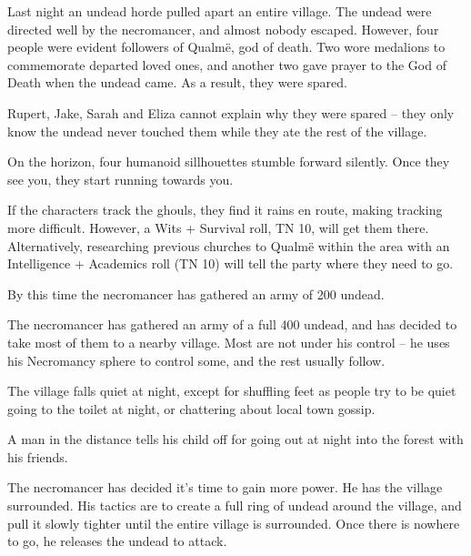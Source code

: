 \begin{multicols}{2}

Last night an undead horde pulled apart an entire village.  The undead were directed well by the necromancer, and almost nobody escaped.
However, four people were evident followers of Qualm\"{e}, god of death.
Two wore medalions to commemorate departed loved ones, and another two gave prayer to the God of Death when the undead came.
As a result, they were spared.

Rupert, Jake, Sarah and Eliza cannot explain why they were spared -- they only know the undead never touched them while they ate the rest of the village.

\begin{boxtext}

	On the horizon, four humanoid sillhouettes stumble forward silently.  Once they see you, they start running towards you.

\end{boxtext}

If the characters track the ghouls, they find it rains en route, making tracking more difficult.
However, a Wits + Survival roll, TN 10, will get them there.
Alternatively, researching previous churches to Qualm\"{e} within the area with an Intelligence + Academics roll (TN 10) will tell the party where they need to go.

By this time the necromancer has gathered an army of 200 undead.


The necromancer has gathered an army of a full 400 undead, and has decided to take most of them to a nearby village.  Most are not under his control -- he uses his Necromancy sphere to control some, and the rest usually follow.

\begin{boxtext}
	The village falls quiet at night, except for shuffling feet as people try to be quiet going to the toilet at night, or chattering about local town gossip.

	A man in the distance tells his child off for going out at night into the forest with his friends.
\end{boxtext}

The necromancer has decided it's time to gain more power.  He has the village surrounded.
His tactics are to create a full ring of undead around the village, and pull it slowly tighter until the entire village is surrounded.
Once there is nowhere to go, he releases the undead to attack.


\end{multicols}

